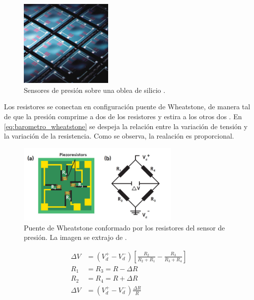 \begin{figure}[H]
    \centering
    \includegraphics[width=0.4\textwidth]{img/MEMS_barometro.png}
    \caption{Sensores de presión sobre una oblea de silicio \cite{baro_1}.}
    \label{fig:MEMS_barometro}
\end{figure}

Los resistores se conectan en configuración puente de Wheatstone, de manera tal de que la presión comprime a dos de los resistores y estira a los otros dos \cite{baro_3}. En \eqref{eq:barometro_wheatstone} se despeja la relación entre la variación de tensión y la variación de la resistencia. Como se observa, la realación es proporcional.

\begin{figure}[H]
    \centering
    \includegraphics[width=0.7\textwidth]{img/barometro_wheatstone.png}
    \caption{Puente de Wheatstone conformado por los resistores del sensor de presión. La imagen se extrajo de \cite{baro_3}.}
    \label{fig:barometro_wheatstone}
\end{figure}

\begin{subequations}
    \begin{align}
        \Delta V &= (V_d^+ - V_d^-) \left[ \frac{R_2}{R_2 + R_1} - \frac{R_3}{R_3 + R_4} \right]\\
        R_1 &= R_3 = R - \Delta R\\
        R_2 &= R_4 = R + \Delta R\\
        \Delta V &= (V_d^+ - V_d^-) \frac{\Delta R}{R}
    \end{align}
    \label{eq:barometro_wheatstone}
\end{subequations}

